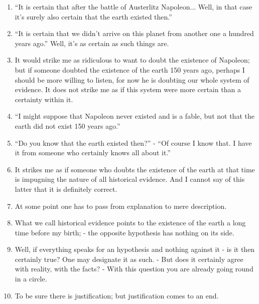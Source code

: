 \documentclass{book}
\begin{document}
\begin{enumerate}
\item
``It is certain that after the battle of Austerlitz Napoleon... Well, in that
case it's surely also certain that the earth existed then.''

\item
``It is certain that we didn't arrive on this planet from another one a hundred
years ago.'' Well, it's as certain as such things are.

\item
It would strike me as ridiculous to want to doubt the existence of Napoleon;
but if someone doubted the existence of the earth 150 years ago, perhaps I
should be more willing to listen, for now he is doubting our whole system of
evidence. It does not strike me as if this system were more certain than a
certainty within it.

\item
``I might suppose that Napoleon never existed and is a fable, but not that the
earth did not exist 150 years ago.''

\item
``Do you know that the earth existed then?'' - ``Of course I know that. I have
it from someone who certainly knows all about it.''

\item
It strikes me as if someone who doubts the existence of the earth at that time
is impugning the nature of all historical evidence. And I cannot say of this
latter that it is definitely correct.

\item
At some point one has to pass from explanation to mere description.

\item
What we call historical evidence points to the existence of the earth a long
time before my birth; - the opposite hypothesis has nothing on its side.

\item
Well, if everything speaks for an hypothesis and nothing against it - is it
then certainly true? One may designate it as such. - But does it certainly
agree with reality, with the facts? - With this question you are already going
round in a circle.

\item
To be sure there is justification; but justification comes to an end.

\chapter{}


\end{enumerate}
\end{document}
